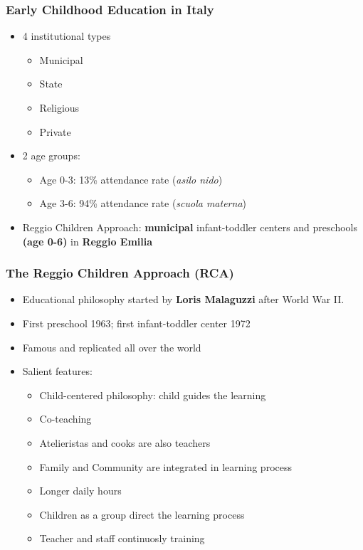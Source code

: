 \begin{frame}
\frametitle{Early Childhood Education in Italy}\label{frame:ECE_IT}
\begin{itemize}
	\item 4 institutional types
	\begin{itemize}
		\item Municipal
		\item State
		\item Religious
		\item Private
	\end{itemize}
	\vspace{1ex}
	\item 2 age groups:
	\begin{itemize}
		\item Age 0-3: 13\% attendance rate (\textit{asilo nido})
		\item Age 3-6: 94\% attendance rate (\textit{scuola materna})
	\end{itemize}
	
	\vspace{3ex}
	
	\item[] Reggio Children Approach: \textbf{municipal} infant-toddler centers and preschools \textbf{(age 0-6)} in \textbf{Reggio Emilia}
\end{itemize} 
\end{frame} 

\begin{frame}
\frametitle{The Reggio Children Approach (RCA)}\label{frame:reggiostyle}
\begin{itemize}
	\item Educational philosophy started by \textbf{Loris Malaguzzi} after World War II.
	\item First preschool 1963; first infant-toddler center 1972 
	\item Famous and replicated all over the world
	\item Salient features:

		\begin{itemize}
		\item Child-centered philosophy: child guides the learning
		\item Co-teaching
		\item Atelieristas and cooks are also teachers
		\item Family and Community are integrated in learning process
		\item Longer daily hours
		\item Children as a group direct the learning process
		\item Teacher and staff continuosly training
		\end{itemize} 
\end{itemize} 
\end{frame} 


